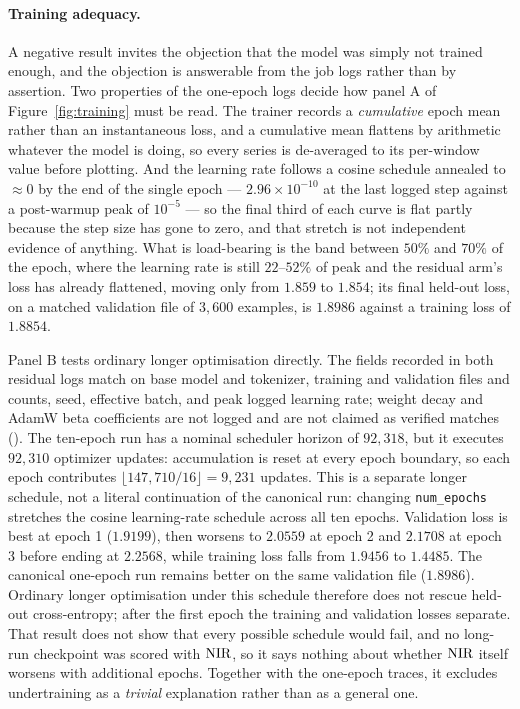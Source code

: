 \paragraph{Training adequacy.} A negative result invites the objection that the model was simply
not trained enough, and the objection is answerable from the job logs rather than by assertion.
Two properties of the one-epoch logs decide how panel A of Figure~\ref{fig:training} must be read. The trainer records
a \emph{cumulative} epoch mean rather than an instantaneous loss, and a cumulative mean flattens by
arithmetic whatever the model is doing, so every series is de-averaged to its per-window value
before plotting. And the learning rate follows a cosine schedule annealed to $\approx 0$ by the end
of the single epoch --- $2.96 \times 10^{-10}$ at the last logged step against a post-warmup peak of
$10^{-5}$ --- so the final third of each curve is flat partly because the step size has gone to
zero, and that stretch is not independent evidence of anything. What is load-bearing is the band
between $50\%$ and $70\%$ of the epoch, where the learning rate is still $22$--$52\%$ of peak and
the residual arm's loss has already flattened, moving only from $1.859$ to $1.854$; its final
held-out loss, on a matched validation file of $3{,}600$ examples, is $1.8986$ against a training
loss of $1.8854$.

Panel B tests ordinary longer optimisation directly. The fields recorded in both residual logs
match on base model and tokenizer, training and validation files and counts, seed, effective batch,
and peak logged learning rate; weight decay and AdamW beta coefficients are not logged and are not
claimed as verified matches (). The ten-epoch run has a nominal
scheduler horizon of $92{,}318$, but it executes $92{,}310$ optimizer updates: accumulation is reset
at every epoch boundary, so each epoch contributes $\lfloor147{,}710/16\rfloor=9{,}231$ updates.
This is a separate longer schedule, not a literal continuation of the canonical run: changing
\texttt{num\_epochs} stretches the cosine learning-rate schedule across all ten epochs.
Validation loss is best at epoch 1 ($1.9199$), then worsens to $2.0559$ at epoch 2 and $2.1708$ at
epoch 3 before ending at $2.2568$, while training loss falls from $1.9456$ to $1.4485$. The canonical
one-epoch run remains better on the same validation file ($1.8986$). Ordinary longer optimisation
under this schedule therefore does not rescue held-out cross-entropy; after the first epoch the
training and validation losses separate. That result does not show that every possible schedule
would fail, and no long-run checkpoint was scored with $\textrm{NIR}$, so it says nothing about whether
$\textrm{NIR}$ itself worsens with additional epochs. Together with the one-epoch traces, it excludes
undertraining as a \emph{trivial} explanation rather than as a general one.

